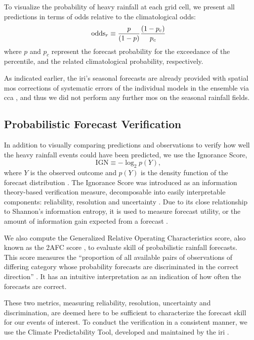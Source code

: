 \documentclass[twocol]{ametsoc}
\begin{document}
To visualize the probability of heavy rainfall at each grid cell, we present all predictions in terms of odds relative to the climatological odds:
\begin{equation} \label{eq:odds-ratio}
	\text{odds}_{r} \equiv \frac{p}{\qty(1 - p)} \frac{\qty(1 - p_c)}{p_c}
\end{equation}
where $p$ and $p_c$ represent the forecast probability for the exceedance of the  percentile, and the related climatological probability, respectively.

As indicated earlier, the \gls{iri}'s seasonal forecasts are already provided with spatial \gls{mos} corrections of systematic errors of the individual models in the ensemble via \gls{cca} \citep{Barnston2010}, and thus we did not perform any further \gls{mos} on the seasonal rainfall fields.

\subsection{Probabilistic Forecast Verification}

In addition to visually comparing predictions and observations to verify how well the heavy rainfall events could have been predicted, we use the Ignorance Score,
\begin{equation}\label{eq:ignorance}
	\text{IGN} \equiv - \log_2 p(Y),
\end{equation}
where $Y$ is the observed outcome and $p(Y)$ is the density function of the forecast distribution \citep{Good1952,Roulston2002,Brocker2007}.
The Ignorance Score was introduced as an information theory-based verification measure,  decomposable into easily interpretable components: reliability, resolution and uncertainty \citep{Weijs2010}.
Due to its close relationship to Shannon's information entropy, it is used to measure forecast utility, or the amount of information gain expected from a forecast \citep{Roulston2002}.

We also compute the Generalized Relative Operating Characteristics score, also known as the 2AFC score \citep{Mason2009}, to evaluate skill of probabilistic rainfall forecasts.
This score measures the ``proportion of all available pairs of observations of differing category whose probability forecasts are discriminated in the correct direction'' \citep{Mason2009}.
It has an intuitive interpretation as an indication of how often the forecasts are correct.

These two metrics, measuring reliability, resolution, uncertainty and discrimination, are deemed here to be sufficient to characterize the forecast skill for our events of interest.
To conduct the verification in a consistent manner, we use the Climate Predictability Tool, developed and maintained by the \gls{iri} \citep{Mason2017}.
\end{document}
